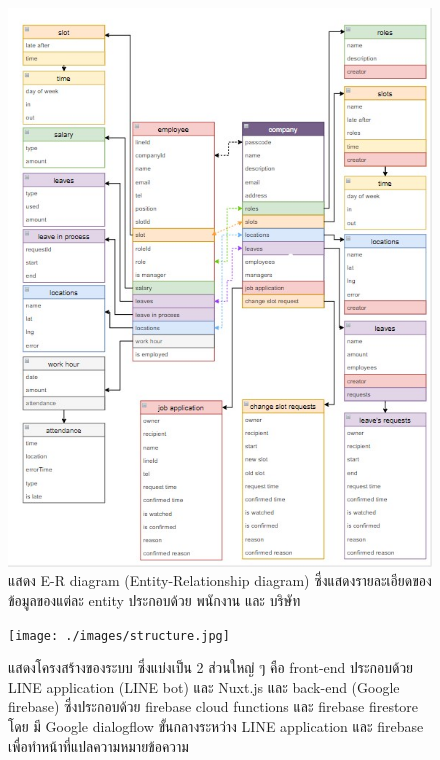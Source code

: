 \begin{figure}
\begin{center}
\includegraphics[width=14cm,keepaspectratio]{./images/penhwang_db_schema.jpg}
\end{center}
\caption[แสดง E-R diagram]{แสดง E-R diagram (Entity-Relationship diagram) ซึ่งแสดงรายละเอียดของข้อมูลของแต่ละ entity ประกอบด้วย พนักงาน และ บริษัท}
\end{figure}

\begin{figure}
\begin{center}
\texttt{[image: ./images/structure.jpg]}
\end{center}
\caption[แสดงโครงสร้างของระบบ]{
  แสดงโครงสร้างของระบบ ซึ่งแบ่งเป็น 2 ส่วนใหญ่ ๆ คือ 
  front-end ประกอบด้วย LINE application (LINE bot) และ Nuxt.js 
  และ back-end (Google firebase) ซึ่งประกอบด้วย firebase cloud functions และ firebase firestore 
  โดย มี Google dialogflow ขั้นกลางระหว่าง LINE application และ firebase เพื่อทำหน้าที่แปลความหมายข้อความ
}
\end{figure}